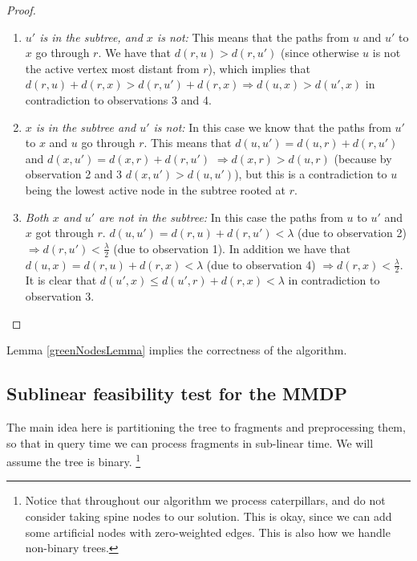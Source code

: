 \documentclass[11pt,a4paper]{article}
\theoremstyle{definition}
\theoremstyle{remark}
\begin{document}
\begin{proof}
{\begin{enumerate}
\item \textit{$u'$ is in the subtree, and $x$ is not:}
This means that the paths from $u$ and $u'$ to $x$ go through $r$. We have that $d(r,u)>d(r,u')$ (since otherwise $u$ is not the active vertex most distant from $r$), which implies that $d(r,u)+d(r,x)>d(r,u')+d(r,x)\Rightarrow d(u,x)>d(u',x)$ in contradiction to observations 3 and 4.

\item \textit{$x$ is in the subtree and $u'$ is not:}
In this case we know that the paths from $u'$ to $x$ and $u$ go through $r$.
This means that $d(u,u') = d(u,r)+d(r,u')$ and $d(x,u') = d(x,r)+d(r,u')$ $\Rightarrow d(x,r)>d(u,r)$ (because by observation 2 and 3 $d(x,u')>d(u,u')$), but this is a contradiction to $u$ being the lowest active node in the subtree rooted at $r$.

\item \textit{Both $x$ and $u'$ are not in the subtree:}
In this case the paths from $u$ to $u'$ and $x$ got through $r$. $d(u,u') = d(r,u)+d(r,u') < \lambda$ (due to observation 2) $\Rightarrow d(r,u')<\frac{\lambda}{2}$ (due to observation 1). In addition we have that $d(u,x) = d(r,u)+d(r,x) < \lambda$ (due to observation 4) $\Rightarrow d(r,x)<\frac{\lambda}{2}$. It is clear that $d(u',x) \leq d(u',r)+d(r,x) < \lambda$ in contradiction to observation 3.
\end{enumerate}
}
\end{proof}
Lemma \ref{greenNodesLemma} implies the correctness of the algorithm.


\subsection{Sublinear feasibility test for the MMDP}
The main idea here is partitioning the tree to fragments and preprocessing them, so that in query time we can process fragments in sub-linear time. We will assume the tree is binary. \footnote{Notice that throughout our algorithm we process caterpillars, and do not consider taking spine nodes to our solution. This is okay, since we can add some artificial nodes with zero-weighted edges. This is also how we handle non-binary trees.}
\end{document}
